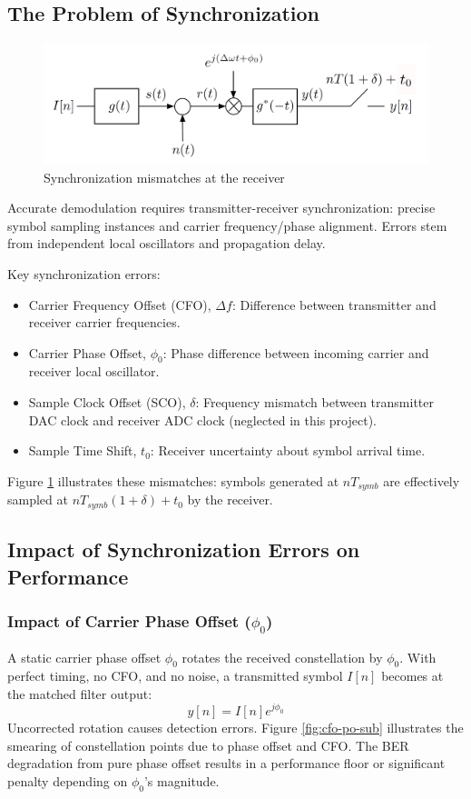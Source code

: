 \documentclass[11pt]{article}
\begin{document}
	\subsection{The Problem of Synchronization}
	\begin{figure}[H]
		\centering
		\includegraphics[width=0.8\linewidth]{Images/sync-errors-conceptual} 
		\caption{Synchronization mismatches at the receiver}
		\label{fig:sync-errors-conceptual}
	\end{figure}
	Accurate demodulation requires transmitter-receiver synchronization: precise symbol sampling instances and carrier frequency/phase alignment. Errors stem from independent local oscillators and propagation delay.
	\par
	Key synchronization errors:
	\begin{itemize}
		\item Carrier Frequency Offset (CFO), $\Delta f$: Difference between transmitter and receiver carrier frequencies.
		\item Carrier Phase Offset, $\phi_0$: Phase difference between incoming carrier and receiver local oscillator.
		\item Sample Clock Offset (SCO), $\delta$: Frequency mismatch between transmitter DAC clock and receiver ADC clock (neglected in this project).
		\item Sample Time Shift, $t_0$: Receiver uncertainty about symbol arrival time.
	\end{itemize}
	Figure \ref{fig:sync-errors-conceptual} illustrates these mismatches: symbols generated at $nT_{symb}$ are effectively sampled at $nT_{symb}(1+\delta)+t_0$ by the receiver.
	
	
	\subsection{Impact of Synchronization Errors on Performance}
	\subsubsection{Impact of Carrier Phase Offset ($\phi_0$)}
	A static carrier phase offset $\phi_0$ rotates the received constellation by $\phi_0$. With perfect timing, no CFO, and no noise, a transmitted symbol $I[n]$ becomes at the matched filter output:
	\begin{equation}
		y[n] = I[n]e^{j\phi_0}
	\end{equation}
	Uncorrected rotation causes detection errors. Figure \ref{fig:cfo-po-sub} illustrates the smearing of constellation points due to phase offset and CFO. The BER degradation from pure phase offset results in a performance floor or significant penalty depending on $\phi_0$'s magnitude.
	
\end{document}
